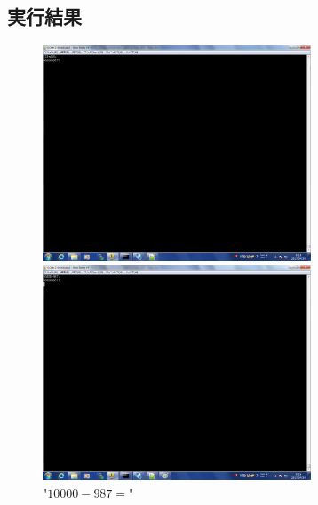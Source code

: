 \documentclass{jsarticle}
\begin{document}
\newpage

\subsection*{実行結果}

\begin{figure}[htbp]
 \begin{minipage}{0.5\hsize}
  \begin{center}
  \includegraphics[width=8cm,bb=0 0 1280 1024]{123+456.png}
  \end{center}
  \caption{"$123+456=$"}
 \end{minipage}
 \begin{minipage}{0.5\hsize}
  \begin{center}
   \includegraphics[width=8cm,bb=0 0 1280 1024]{10000-987.png}
  \end{center}
  \caption{"$10000-987=$"}
 \end{minipage}
\end{figure}
\end{document}
